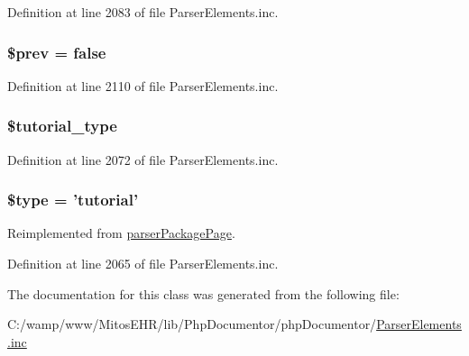 \-Definition at line 2083 of file \-Parser\-Elements.\-inc.

\hypertarget{classparser_tutorial_a6a84acde87e05eb2ec8ca7d45fe7d0c1}{
\subsubsection[{\$prev}]{\setlength{\rightskip}{0pt plus 5cm}\$prev = false}}\label{classparser_tutorial_a6a84acde87e05eb2ec8ca7d45fe7d0c1}


\-Definition at line 2110 of file \-Parser\-Elements.\-inc.

\hypertarget{classparser_tutorial_ad1ff2bbd0671290f3acfecf0f0e84e2f}{
\subsubsection[{\$tutorial\-\_\-type}]{\setlength{\rightskip}{0pt plus 5cm}\$tutorial\-\_\-type}}\label{classparser_tutorial_ad1ff2bbd0671290f3acfecf0f0e84e2f}


\-Definition at line 2072 of file \-Parser\-Elements.\-inc.

\hypertarget{classparser_tutorial_a9a4a6fba2208984cabb3afacadf33919}{
\subsubsection[{\$type}]{\setlength{\rightskip}{0pt plus 5cm}\$type = 'tutorial'}}\label{classparser_tutorial_a9a4a6fba2208984cabb3afacadf33919}


\-Reimplemented from \hyperlink{classparser_package_page_a9a4a6fba2208984cabb3afacadf33919}{parser\-Package\-Page}.



\-Definition at line 2065 of file \-Parser\-Elements.\-inc.



\-The documentation for this class was generated from the following file\-:\begin{DoxyCompactItemize}
\item 
\-C\-:/wamp/www/\-Mitos\-E\-H\-R/lib/\-Php\-Documentor/php\-Documentor/\hyperlink{_parser_elements_8inc}{\-Parser\-Elements.\-inc}\end{DoxyCompactItemize}
